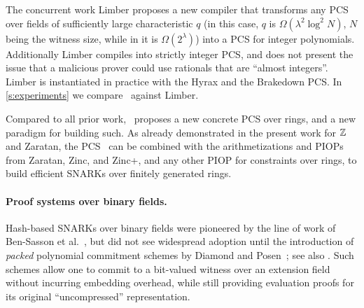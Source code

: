 The concurrent work Limber \cite{limber} proposes a new compiler that transforms any PCS over fields of sufficiently large characteristic $q$ (in this case, $q$ is $\Omega(\lambda^2 \log^2 N)$, $N$ being the witness size, while in \cite{qaren} it is $\Omega(2^\lambda)$) into a PCS for integer polynomials. Additionally Limber compiles into strictly integer PCS, and does not present the issue that a malicious prover could use rationals that are ``almost integers''. Limber is instantiated in practice with the Hyrax and the Brakedown PCS. In \cref{s:experiments} we compare \ftwoz \ against Limber.
\fi

Compared to all prior work, \ftwoz\ proposes a new  concrete PCS over rings, and a new paradigm  for building such. As already demonstrated in the present work for $\mathbb{Z}$ and Zaratan, the PCS \ftwoz\ can be combined with the arithmetizations and PIOPs from Zaratan, Zinc, and Zinc+, and any other PIOP for constraints over rings, to build efficient SNARKs over finitely generated rings.


\paragraph{Proof systems over binary fields.} Hash-based SNARKs over binary fields were pioneered by the line of work of Ben-Sasson et al.~\cite{fri,stark,linearSizedIOPs,cryptoeprint:2022/1542}, but did not see widespread adoption until the introduction of \textit{packed} polynomial commitment schemes by Diamond and Posen~\cite{binius,binius2}; see also \cite{binius64}. Such schemes allow one to commit to a bit-valued witness over an extension field without incurring embedding overhead, while still providing evaluation proofs for its original ``uncompressed'' representation. %


